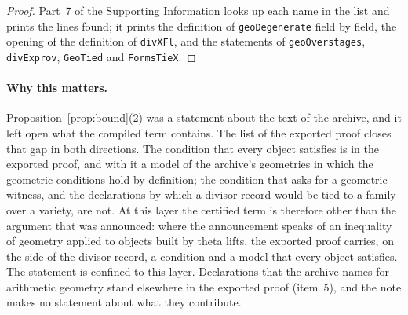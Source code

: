 \documentclass[11pt]{article}
\theoremstyle{definition}
\theoremstyle{remark}
\DeclareRobustCommand{\lean}[1]{{\renewcommand{\_}{\textunderscore\allowbreak}\texttt{#1}}}
\begin{document}
\begin{proof}
Part~7 of the Supporting Information looks up each name in the list and prints the lines found; it prints the definition of \lean{geoDegenerate} field by field, the opening of the definition of \lean{divXFl}, and the statements of \lean{geoOver\_stages}, \lean{divEx\_prov}, \lean{GeoTied} and \lean{FormsTieX}.
\end{proof}

\paragraph{Why this matters.} Proposition~\ref{prop:bound}(2) was a statement about the text of the archive, and it left open what the compiled term contains. The list of the exported proof closes that gap in both directions. The condition that every object satisfies is in the exported proof, and with it a model of the archive's geometries in which the geometric conditions hold by definition; the condition that asks for a geometric witness, and the declarations by which a divisor record would be tied to a family over a variety, are not. At this layer the certified term is therefore other than the argument that was announced: where the announcement speaks of an inequality of geometry applied to objects built by theta lifts, the exported proof carries, on the side of the divisor record, a condition and a model that every object satisfies. The statement is confined to this layer. Declarations that the archive names for arithmetic geometry stand elsewhere in the exported proof (item~5), and the note makes no statement about what they contribute.
\end{document}
